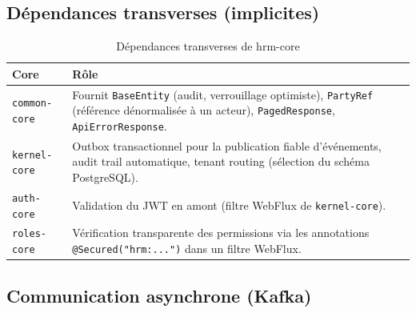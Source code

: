 \documentclass[a4paper,12pt,openany]{book}
\begin{document}
    \subsection{Dépendances transverses (implicites)}

    \begin{table}[H]
        \centering
        \caption{Dépendances transverses de hrm-core}
        \label{tab:deps-transverse}
        \begin{tabularx}{\textwidth}{lX}
    \toprule
    \textbf{Core} & \textbf{Rôle} \\
    \midrule
    \texttt{common-core}  & Fournit \texttt{BaseEntity} (audit, verrouillage optimiste), \texttt{PartyRef} (référence dénormalisée à un acteur), \texttt{PagedResponse}, \texttt{ApiErrorResponse}. \\
    \texttt{kernel-core}  & Outbox transactionnel pour la publication fiable d'événements, audit trail automatique, tenant routing (sélection du schéma PostgreSQL). \\
    \texttt{auth-core}    & Validation du JWT en amont (filtre WebFlux de \texttt{kernel-core}). \\
    \texttt{roles-core}   & Vérification transparente des permissions via les annotations \texttt{@Secured("hrm:...")} dans un filtre WebFlux. \\
    \bottomrule
        \end{tabularx}
    \end{table}

    \subsection{Communication asynchrone (Kafka)}
\end{document}
